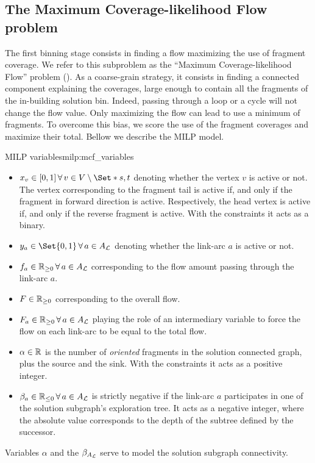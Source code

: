\subsection{The Maximum Coverage-likelihood Flow problem \MCF{}}\label{sec:method:mcf}

The first binning stage consists in finding a flow maximizing the use of fragment coverage.
We refer to this subproblem as the \enquote{Maximum Coverage-likelihood Flow} problem (\MCF{}).
As a coarse-grain strategy, it consists in finding a connected component explaining the coverages, large enough to contain all the fragments of the in-building solution bin.
Indeed, passing through a loop or a cycle will not change the flow value. Only maximizing the flow can lead to use a minimum of fragments.
To overcome this bias, we score the use of the fragment coverages and maximize their total.
Bellow we describe the MILP model.

\begin{definition}{\MCF{} MILP variables}{milp:mcf_variables}
  \begin{itemize}
    \item \(x_v \in [0, 1] \, \forall v \in V \setminus \Set*{s, t}\) denoting whether the vertex \(v\) is active or not.
      The vertex corresponding to the fragment tail is active if, and only if the fragment in forward direction is active. Respectively, the head vertex is active if, and only if the reverse fragment is active. With the constraints it acts as a binary.
    \item \(y_a \in \Set{0, 1} \, \forall a \in A_\Links{}\) denoting whether the link-arc \(a\) is active or not.
    \item \(f_a \in \Reals_{\geq 0} \, \forall a \in A_\Links{}\) corresponding to the flow amount passing through the link-arc \(a\).
    \item \(F \in \mathbb{R}_{\geq 0}\) corresponding to the overall flow.
    \item \(F_a \in \Reals_{\geq 0} \, \forall a \in A_\Links{}\) playing the role of an intermediary variable to force the flow on each link-arc to be equal to the total flow.
    \item \(\alpha \in \mathbb{R}{}\) is the number of \emph{oriented} fragments in the solution connected graph, plus the source and the sink. With the constraints it acts as a positive integer.
    \item \(\beta_a \in \Reals_{\leq 0} \, \forall a \in A_\Links{}\) is strictly negative if the link-arc \(a\) participates in one of the solution subgraph's exploration tree.
      It acts as a negative integer, where the absolute value corresponds to the depth of the subtree defined by the successor.
  \end{itemize}
  Variables \(\alpha{}\) and the \(\beta_{A_{\mathcal{L}}{}}\) serve to model the solution subgraph connectivity.
\end{definition}

